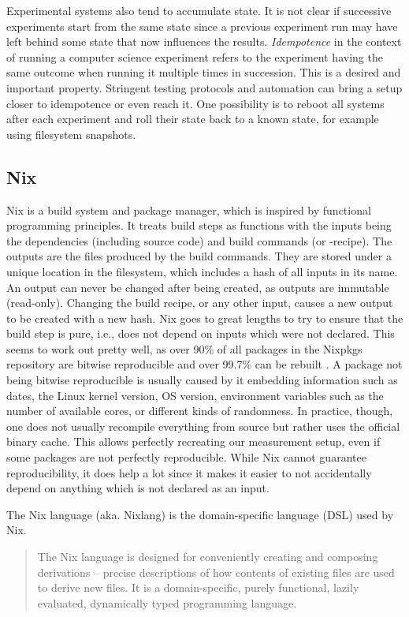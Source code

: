 Experimental systems also tend to accumulate state.
It is not clear if successive experiments start from the same state since a previous experiment run may have left behind some state that now influences the results.
\textit{Idempotence} \cite{wiki:Idempotence} in the context of running a computer science experiment refers to the experiment having the same outcome when running it multiple times in succession.
This is a desired and important property.
Stringent testing protocols and automation can bring a setup closer to idempotence or even reach it.
One possibility is to reboot all systems after each experiment and roll their state back to a known state, for example using filesystem snapshots.
\subsection{Nix}
\label{Nix-explanation}
Nix is a build system and package manager, which is inspired by functional programming principles.
It treats build steps as functions with the inputs being the dependencies (including source code) and build commands (or -recipe).
The outputs are the files produced by the build commands.
They are stored under a unique location in the filesystem, which includes a hash of all inputs in its name.
An output can never be changed after being created, as outputs are immutable (read-only).
Changing the build recipe, or any other input, causes a new output to be created with a new hash.
Nix goes to great lengths to try to ensure that the build step is pure, i.e., does not depend on inputs which were not declared.
This seems to work out pretty well, as over 90\% of all packages in the Nixpkgs repository are bitwise reproducible and over 99.7\% can be rebuilt \cite{malka:hal-04913007}.
A package not being bitwise reproducible is usually caused by it embedding information such as dates, the Linux kernel version, OS version, environment variables such as the number of available cores, or different kinds of randomness.
In practice, though, one does not usually recompile everything from source but rather uses the official binary cache.
This allows perfectly recreating our measurement setup, even if some packages are not perfectly reproducible.
While Nix cannot guarantee reproducibility, it does help a lot since it makes it easier to not accidentally depend on anything which is not declared as an input.

The Nix language (aka. Nixlang) is the domain-specific language (DSL) used by Nix.
\blockquote[\cite{nixlang}]{The Nix language is designed for conveniently creating and composing derivations – precise descriptions of how contents of existing files are used to derive new files. It is a domain-specific, purely functional, lazily evaluated, dynamically typed programming language.}

